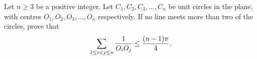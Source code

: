 Let $n\geq3$ be a positive integer. Let $C_1,C_2,C_3,\ldots,C_n$ be unit circles in the plane, with centres $O_1,O_2,O_3,\ldots,O_n$ respectively. If no line meets more than two of the circles, prove that \[ \sum\limits^{}_{1\leq i<j\leq n}{1\over O_iO_j}\leq{(n-1)\pi\over 4}.  \]